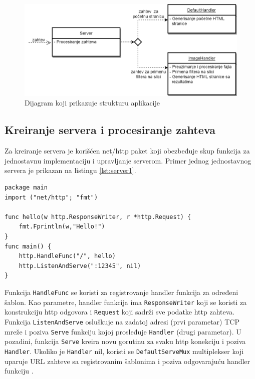 \documentclass[12pt,oneside]{memoir}
\begin{document}
\begin{figure}
\begin{center}
\includegraphics[scale=0.33]{dijagram.png}
\end{center}
\caption{Dijagram koji prikazuje strukturu aplikacije}
\label{fig:diag}
\end{figure}

\subsection{Kreiranje servera i procesiranje zahteva}

Za kreiranje servera je korišćen net/http paket koji obezbeđuje skup funkcija za jednostavnu implementaciju i upravljanje serverom. Primer jednog jednostavnog servera je prikazan na listingu \ref{lst:server1}. 

\begin{center}
\begin{lstlisting}[caption=Primer jednostavnog servera,label={lst:server1},   backgroundcolor=\color{background}]
package main
import ("net/http"; "fmt")

func hello(w http.ResponseWriter, r *http.Request) {
	fmt.Fprintln(w,"Hello!")
}
func main() {
	http.HandleFunc("/", hello)
	http.ListenAndServe(":12345", nil)
}
\end{lstlisting}
\end{center}


Funkcija \texttt{HandleFunc} se koristi za registrovanje handler funkcija za određeni šablon. Kao parametre, handler funkcija ima \texttt{ResponseWriter} koji se koristi za konstrukciju http odgovora i \texttt{Request} koji sadrži sve podatke http zahteva. Funkcija \texttt{ListenAndServe} osluškuje na zadatoj adresi (prvi parametar) TCP mreže i poziva \texttt{Serve} funkciju kojoj prosleđuje \texttt{Handler} (drugi parametar). U pozadini, funkcija \texttt{Serve} kreira novu gorutinu za svaku http konekciju i poziva \texttt{Handler}. Ukoliko je \texttt{Handler} nil, koristi se \texttt{DefaultServeMux} multiplekser koji uparuje URL zahteve sa registrovanim šablonima i poziva odgovarajuću handler funkciju \cite{http}.
\end{document}
